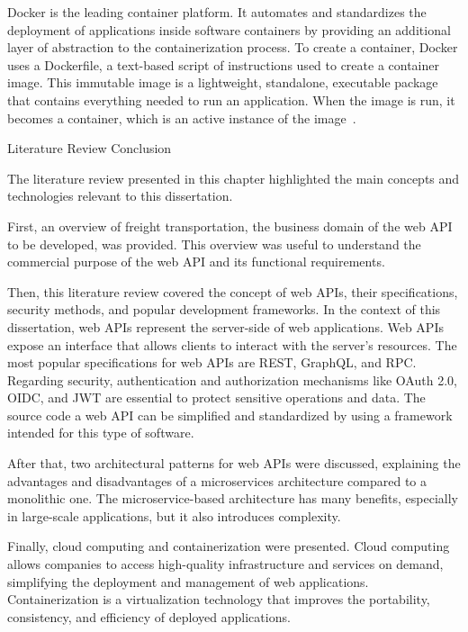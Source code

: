 \documentclass[12pt, reqno]{amsbook}
\makeatletter
\def\section{\@startsection{section}{1}%
      \z@{.5\linespacing\@plus.7\linespacing}{.25\linespacing}%
      {\normalfont\bfseries\flushleft}}
\theoremstyle{definition}
\theoremstyle{definition}
\numberwithin{section}{chapter}
\numberwithin{table}{chapter}
\numberwithin{figure}{chapter}
\makeatother
\begin{document}
Docker is the leading container platform. It automates and standardizes the deployment of applications inside software containers by providing an additional layer of abstraction to the containerization process. To create a container, Docker uses a Dockerfile, a text-based script of instructions used to create a container image. This immutable image is a lightweight, standalone, executable package that contains everything needed to run an application. When the image is run, it becomes a container, which is an active instance of the image~\cite{Figueira2024, Hardikar2021, Potdar2020}.

\section{Literature Review Conclusion}
\label{Section:Literature_Review_Conclusion}

The literature review presented in this chapter highlighted the main concepts and technologies relevant to this dissertation.

First, an overview of freight transportation, the business domain of the web \ac{API} to be developed, was provided. This overview was useful to understand the commercial purpose of the web \ac{API} and its functional requirements.

Then, this literature review covered the concept of web \acp{API}, their specifications, security methods, and popular development frameworks. In the context of this dissertation, web \acp{API} represent the server-side of web applications. Web \acp{API} expose an interface that allows clients to interact with the server's resources. The most popular specifications for web \acp{API} are \ac{REST}, GraphQL, and \ac{RPC}. Regarding security, authentication and authorization mechanisms like \ac{OAuth} 2.0, \ac{OIDC}, and \ac{JWT} are essential to protect sensitive operations and data. The source code a web \ac{API} can be simplified and standardized by using a framework intended for this type of software.

After that, two architectural patterns for web \acp{API} were discussed, explaining the advantages and disadvantages of a microservices architecture compared to a monolithic one. The microservice-based architecture has many benefits, especially in large-scale applications, but it also introduces complexity.

Finally, cloud computing and containerization were presented. Cloud computing allows companies to access high-quality infrastructure and services on demand, simplifying the deployment and management of web applications. Containerization is a virtualization technology that improves the portability, consistency, and efficiency of deployed applications.
\end{document}
